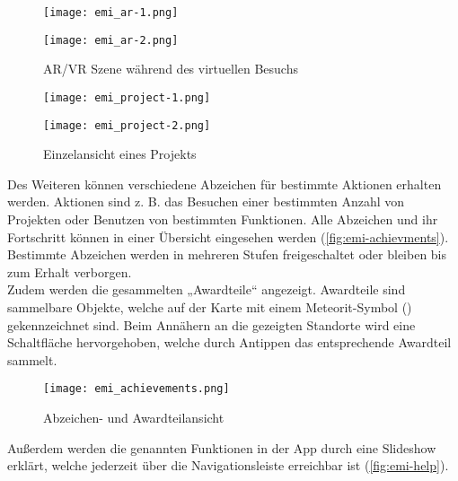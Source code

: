 \begin{figure}[htpb]
    \begin{minipage}{.5\textwidth}
        \centering
        \texttt{[image: emi\_ar-1.png]}
    \end{minipage}%
    \begin{minipage}{.5\textwidth}
        \centering
        \texttt{[image: emi\_ar-2.png]}
    \end{minipage}
    \caption{\ac{AR}/\ac{VR} Szene während des virtuellen Besuchs}
    \label{fig:emi-ar}
\end{figure}

\begin{figure}[htpb]
    \begin{minipage}{.5\textwidth}
        \centering
        \texttt{[image: emi\_project-1.png]}
    \end{minipage}%
    \begin{minipage}{.5\textwidth}
        \centering
        \texttt{[image: emi\_project-2.png]}
    \end{minipage}
    \caption{Einzelansicht eines Projekts}
    \label{fig:emi-project}
\end{figure}

Des Weiteren können verschiedene Abzeichen für bestimmte Aktionen erhalten
werden. Aktionen sind z. B. das Besuchen einer bestimmten Anzahl von Projekten
oder Benutzen von bestimmten Funktionen. Alle Abzeichen und ihr Fortschritt
können in einer Übersicht eingesehen werden (\autoref{fig:emi-achievments}).
Bestimmte Abzeichen werden in mehreren Stufen freigeschaltet oder bleiben bis
zum Erhalt verborgen. \\
Zudem werden die gesammelten „Awardteile“ angezeigt. Awardteile sind sammelbare
Objekte, welche auf der Karte mit einem Meteorit-Symbol
() gekennzeichnet sind. Beim Annähern an die
gezeigten Standorte wird eine Schaltfläche hervorgehoben, welche durch Antippen
das entsprechende Awardteil sammelt.

\begin{figure}[htpb]
    \centering
    \texttt{[image: emi\_achievements.png]}
    \caption{Abzeichen- und Awardteilansicht}
    \label{fig:emi-achievments}
\end{figure}


\newpage
Außerdem werden die genannten Funktionen in der App durch eine Slideshow
erklärt, welche jederzeit über die Navigationsleiste erreichbar ist (\autoref{fig:emi-help}).

